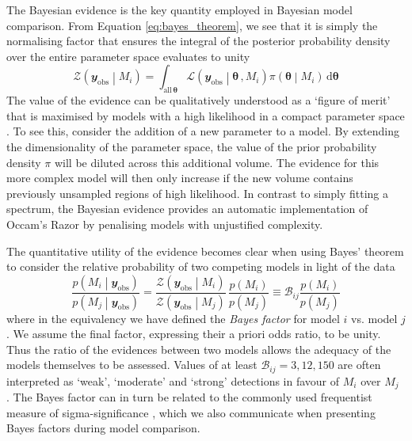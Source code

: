 \documentclass[fleqn,usenatbib]{mnras}
\begin{document}
The Bayesian evidence is the key quantity employed in Bayesian model comparison. From Equation \ref{eq:bayes_theorem}, we see that it is simply the normalising factor that ensures the integral of the posterior probability density over the entire parameter space evaluates to unity
%
\begin{equation}
\mathcal{Z}\left(\mathbfit{y}_{\mathrm{obs}} \middle| M_{i} \right) = \int_{\mathrm{all} \, \boldsymbol{\theta}} \mathcal{L}\left(\mathbfit{y}_{\mathrm{obs}} \middle| \boldsymbol{\theta} \, , M_{i} \right) \pi\left(\boldsymbol{\theta} \middle| M_{i} \right) \, \mathrm{d}\boldsymbol{\theta}
	\label{eq:evidence}
\end{equation}
%
The value of the evidence can be qualitatively understood as a `figure of merit' that is maximised by models with a high likelihood in a compact parameter space \citep{Trotta2008}. To see this, consider the addition of a new parameter to a model. By extending the dimensionality of the parameter space, the value of the prior probability density $\pi$ will be diluted across this additional volume. The evidence for this more complex model will then only increase if the new volume contains previously unsampled regions of high likelihood. In contrast to simply fitting a spectrum, the Bayesian evidence provides an automatic implementation of Occam's Razor by penalising models with unjustified complexity.

The quantitative utility of the evidence becomes clear when using Bayes' theorem to consider the relative probability of two competing models in light of the data
%
\begin{equation}
\frac{p \left(M_{i} \middle| \mathbfit{y}_{\mathrm{obs}} \right)}{p \left(M_{j} \middle| \mathbfit{y}_{\mathrm{obs}}\right)} = \frac{\mathcal{Z}\left(\mathbfit{y}_{\mathrm{obs}} \middle| M_{i} \right)}{\mathcal{Z}\left(\mathbfit{y}_{\mathrm{obs}} \middle| M_{j} \right)} \, \frac{p \left(M_{i} \right)}{p \left(M_{j} \right)} \equiv \mathcal{B}_{ij} \frac{p \left(M_{i} \right)}{p \left(M_{j} \right)}
	\label{eq:posterior_odds}
\end{equation}
%
where in the equivalency we have defined the \emph{Bayes factor} for model $i$ vs. model $j$. We assume the final factor, expressing their a priori odds ratio, to be unity. Thus the ratio of the evidences between two models allows the adequacy of the models themselves to be assessed. Values of at least $\mathcal{B}_{ij} = 3, 12, 150$ are often interpreted as `weak', `moderate' and `strong' detections in favour of $M_{i}$ over $M_{j}$ \citep{Trotta2008,Benneke2013}. The Bayes factor can in turn be related to the commonly used frequentist measure of sigma-significance \citep{Selke2001}, which we also communicate when presenting Bayes factors during model comparison.
\end{document}
